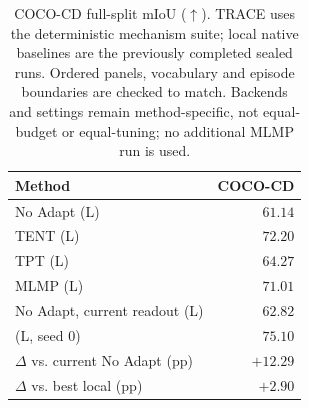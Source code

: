 \begin{table}[t]
\caption{COCO-CD full-split mIoU ($\uparrow$). TRACE uses the deterministic mechanism suite; local native baselines are the previously completed sealed runs. Ordered panels, vocabulary and episode boundaries are checked to match. Backends and settings remain method-specific, not equal-budget or equal-tuning; no additional MLMP run is used.}
\label{tab:cd-local}
\centering\small
\begin{tabular}{@{}lr@{}}
\toprule
Method & COCO-CD \\
\midrule
No Adapt (L) & $61.14$ \\
TENT (L) & $72.20$ \\
TPT (L) & $64.27$ \\
MLMP (L) & $71.01$ \\
\midrule
No Adapt, current readout (L) & $62.82$ \\
\method{} (L, seed 0) & $\mathbf{75.10}$ \\
$\Delta$ vs. current No Adapt (pp) & $+12.29$ \\
$\Delta$ vs. best local (pp) & $+2.90$ \\
\bottomrule
\end{tabular}
\end{table}

